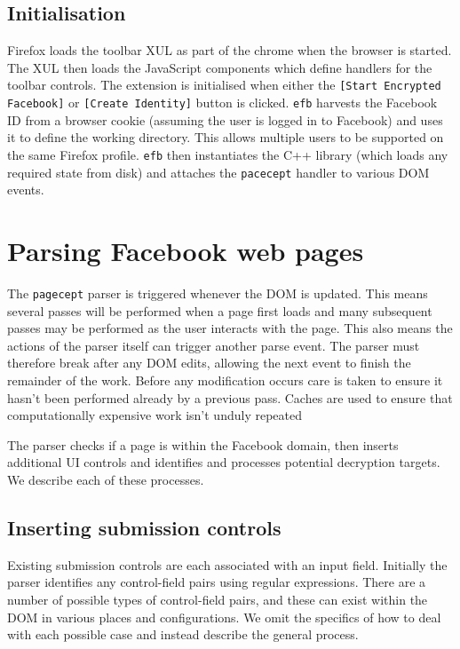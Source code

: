     
\FloatBarrier    
\subsection{Initialisation}

Firefox loads the toolbar XUL as part of the chrome when the browser is started. The XUL then loads the JavaScript components which define handlers for the toolbar controls. The extension is initialised when either the {\tt [Start Encrypted Facebook]} or {\tt [Create Identity]} button is clicked. {\tt efb} harvests the Facebook ID from a browser cookie (assuming the user is logged in to Facebook) and uses it to define the working directory. This allows multiple users to be supported on the same Firefox profile. {\tt efb} then instantiates the C++ library (which loads any required state from disk) and attaches the {\tt pacecept} handler to various DOM events.


\FloatBarrier
\section{Parsing Facebook web pages}
\label{sec:parsing}

The {\tt pagecept} parser is triggered whenever the DOM is updated. This means several passes will be performed when a page first loads and many subsequent passes may be performed as the user interacts with the page. This also means the actions of the parser itself can trigger another parse event. The parser must therefore break after any DOM edits, allowing the next event to finish the remainder of the work. Before any modification occurs care is taken to ensure it hasn't been performed already by a previous pass. Caches are used to ensure that computationally expensive work isn't unduly repeated

The parser checks if a page is within the Facebook domain, then inserts additional UI controls and identifies and processes potential decryption targets. We describe each of these processes.

\subsection{Inserting submission controls}
\label{ssec:insert}

Existing submission controls are each associated with an input field. Initially the parser identifies any control-field pairs using regular expressions. There are a number of possible types of control-field pairs, and these can exist within the DOM in various places and configurations. We omit the specifics of how to deal with each possible case and instead describe the general process.

